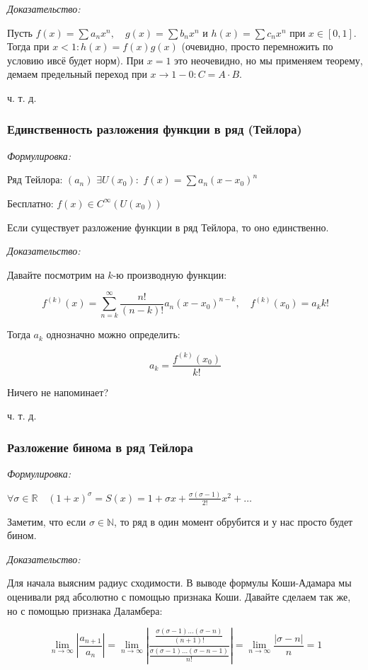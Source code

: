 \documentclass{article}
\def\dbl{\,\,}
\begin{document}
\textit{Доказательство:}

Пусть $f(x) = \sum a_nx^n, \quad g(x) = \sum b_nx^n$ и $h(x) = \sum c_nx^n$ при $x \in [0, 1]$. Тогда при $x < 1: h(x) = f(x)g(x)$ (очевидно, просто перемножить по  условию ивсё будет норм). При $x = 1$ это неочевидно, но мы применяем теорему, демаем предельный переход при $x \rightarrow 1 - 0: C = A \cdot B$.

ч. т. д.

\subsubsection{Единственность разложения функции в ряд (Тейлора)}
\textit{Формулировка:}

Ряд Тейлора: $(a_n) \dbl \exists U(x_0): \dbl f(x) = \sum a_n (x - x_0)^n$

Бесплатно: $f(x) \in C^{\infty}(U(x_0))$

Если существует разложение функции в ряд Тейлора, то оно единственно.

\textit{Доказательство:}

Давайте посмотрим на $k$-ю производную функции:

\[f^{(k)}(x) = \sum_{n = k}^{\infty}\frac{n!}{(n - k)!}a_n(x - x_0)^{n - k}, \quad f^{(k)}(x_0) = a_kk!\]

Тогда $a_k$ однозначно можно определить: 

\[a_k = \frac{f^{(k)}(x_0)}{k!}\]

Ничего не напоминает?

ч. т. д.


\subsubsection{Разложение бинома в ряд Тейлора}
\textit{Формулировка:}

$\forall \sigma \in \mathbb{R} \quad (1 + x)^{\sigma} = S(x) = 1 + \sigma x + \frac{\sigma (\sigma - 1)}{2!}x^2 + \ldots$

Заметим, что если $\sigma \in \mathbb{N}$, то ряд в один момент обрубится и у нас просто будет бином.

\textit{Доказательство:}

Для начала выясним радиус сходимости. В выводе формулы Коши-Адамара мы оценивали ряд абсолютно с помощью признака Коши. Давайте сделаем так же, но с помощью признака Даламбера:

\[\lim_{n \rightarrow \infty}\left|\frac{a_{n + 1}}{a_{n}}\right| = \lim_{n \rightarrow \infty} \left| \frac{\frac{\sigma(\sigma - 1)\ldots(\sigma - n)}{(n + 1)!}}{\frac{\sigma(\sigma - 1)\ldots(\sigma - n - 1)}{n!}} \right| = \lim_{n \rightarrow \infty}{\frac{|\sigma - n|}{n}} = 1\]
\end{document}
